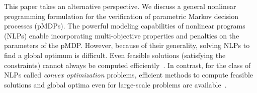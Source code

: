 This paper takes an alternative perspective. 
We discuss a general nonlinear programming formulation for the verification of parametric Markov decision processes (pMDPs).
 The powerful modeling capabilities of nonlinear programs (NLPs) enable incorporating multi-objective properties and penalties on the parameters of the pMDP.
However, because of their generality, solving NLPs to find a global optimum is difficult. Even feasible solutions (satisfying the constraints) cannot always be computed efficiently~\cite{bertsekas1999nonlinear,Las01}. 
In contrast, for the class of NLPs called \emph{convex optimization} problems, efficient methods to compute feasible solutions and global optima even for large-scale problems are available~\cite{boyd_convex_optimization}. 

